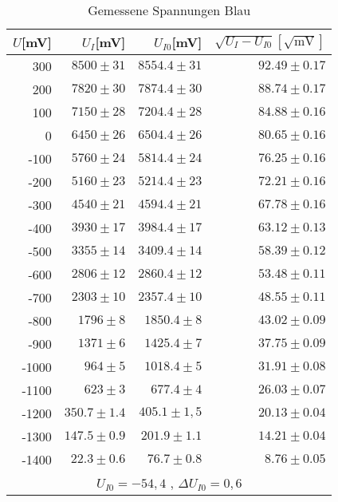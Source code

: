 \begin{table}[h!]
  \centering
  \caption{Gemessene Spannungen Blau}
    \begin{tabular}{r | r | r | r}
    \toprule
    $U$[mV] & $U_I$[mV] & $U_{I0}$[mV] & $\sqrt{U_I  - U_{I0}}[\sqrt{\text{mV}}]$\\
    \midrule
    300   & $8500 \pm  31$ &$ 8554.4 \pm 31$ & $92.49 \pm 0.17$ \\
    200   & $7820 \pm 30$ & $7874.4 \pm 30$ &$ 88.74  \pm0.17$ \\
    100   & $7150 \pm28$ &$ 7204.4 \pm 28$ & $84.88 \pm0.16$\\
    0     & $6450 \pm 26$ & $6504.4 \pm 26$ & $80.65  \pm0.16$ \\
    -100  & $5760 \pm 24$ & $5814.4 \pm 24$ & $76.25 \pm 0.16$ \\
    -200  & $5160 \pm 23$ & $5214.4 \pm 23$ & $72.21 \pm 0.16$\\
    -300  & $4540 \pm 21$ & $4594.4 \pm 21$ & $67.78 \pm 0.16$ \\
    -400  & $3930 \pm 17$ & $3984.4 \pm 17$ & $63.12 \pm0.13$ \\
    -500  & $3355 \pm 14$ & $3409.4 \pm 14$ & $58.39 \pm0.12$ \\
    -600  & $2806 \pm 12$ & $2860.4 \pm 12$ & $53.48 \pm 0.11$ \\
    -700  & $2303 \pm 10$ & $2357.4 \pm 10$ &$ 48.55 \pm 0.11$ \\
    -800  &$ 1796 \pm 8$& $1850.4 \pm 8$ &$ 43.02  \pm0.09$ \\
    -900  & $1371\pm 6 $& $1425.4 \pm 7$ & $37.75  \pm0.09$ \\
    -1000 & $964 \pm 5$ & $1018.4 \pm 5 $& $31.91 \pm 0.08$ \\
    -1100 & $623 \pm 3$ & $677.4 \pm 4$ & $26.03 \pm0.07$\\
    -1200 & $350.7  \pm1.4$ & $405.1 \pm 1,5$ &$ 20.13 \pm 0.04$ \\
    -1300 & $147.5 \pm 0.9$ & $201.9 \pm 1.1$& $14.21 \pm0.04$ \\
    -1400 & $22.3  \pm 0.6$ & $76.7  \pm 0.8$ & $8.76 \pm 0.05$ \\
    \bottomrule
    \multicolumn{4}{c}{$U_{I0} = -54,4$ , $\Delta U_{I0} = 0,6$}
    \end{tabular}%
\end{table}%
